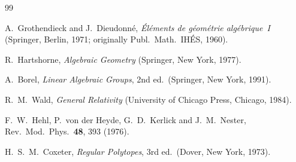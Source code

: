 \documentclass[twocolumn]{iopjournal}
\begin{document}
\begin{thebibliography}{99}

A.~Grothendieck and J.~Dieudonn\'{e},
\textit{\'{E}l\'{e}ments de g\'{e}om\'{e}trie alg\'{e}brique~I}
(Springer, Berlin, 1971; originally Publ.\ Math.\ IH\'{E}S, 1960).

R.~Hartshorne,
\textit{Algebraic Geometry}
(Springer, New York, 1977).

A.~Borel,
\textit{Linear Algebraic Groups}, 2nd ed.\
(Springer, New York, 1991).

R.~M.~Wald,
\textit{General Relativity}
(University of Chicago Press, Chicago, 1984).

F.~W.~Hehl, P.~von der Heyde, G.~D.~Kerlick and J.~M.~Nester,
Rev.\ Mod.\ Phys.\ \textbf{48}, 393 (1976).

H.~S.~M.~Coxeter,
\textit{Regular Polytopes},
3rd ed.\ (Dover, New York, 1973).

\end{thebibliography}
\end{document}
